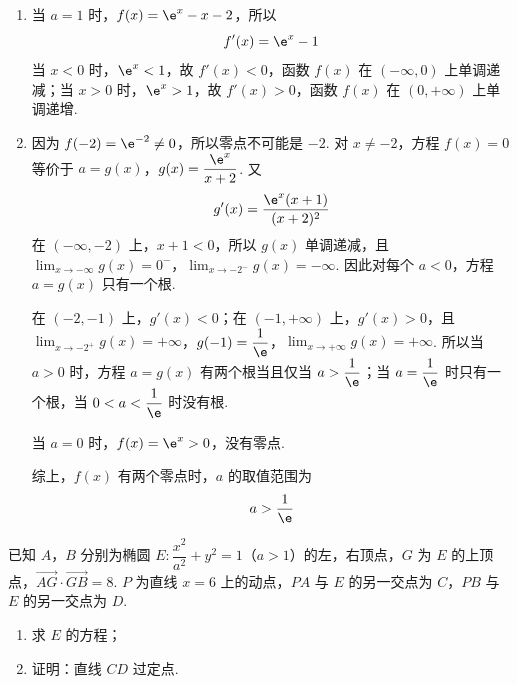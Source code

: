 \begin{solution}
\begin{enumerate}
\item 当 \(a=1\) 时，\(f(x)=\e^x-x-2\)，所以
\[
f'(x)=\e^x-1
\]
当 \(x<0\) 时，\(\e^x<1\)，故 \(f'(x)<0\)，函数 \(f(x)\) 在 \((-\infty,0)\) 上单调递减；当 \(x>0\) 时，\(\e^x>1\)，故 \(f'(x)>0\)，函数 \(f(x)\) 在 \((0,+\infty)\) 上单调递增.

\item 因为 \(f(-2)=\e^{-2}\ne0\)，所以零点不可能是 \(-2\). 对 \(x\ne-2\)，方程 \(f(x)=0\) 等价于
\(a=g(x)\)，\(g(x)=\dfrac{\e^x}{x+2}\).
又
\[
g'(x)=\dfrac{\e^x(x+1)}{(x+2)^2}
\]
在 \((-\infty,-2)\) 上，\(x+1<0\)，所以 \(g(x)\) 单调递减，且
\(\lim_{x\to-\infty}g(x)=0^{-}\)，\(\lim_{x\to-2^-}g(x)=-\infty\).
因此对每个 \(a<0\)，方程 \(a=g(x)\) 只有一个根.

在 \((-2,-1)\) 上，\(g'(x)<0\)；在 \((-1,+\infty)\) 上，\(g'(x)>0\)，且
\(\lim_{x\to-2^+}g(x)=+\infty\)，\(g(-1)=\dfrac1{\e}\)，\(\lim_{x\to+\infty}g(x)=+\infty\).
所以当 \(a>0\) 时，方程 \(a=g(x)\) 有两个根当且仅当 \(a>\dfrac1{\e}\)；当 \(a=\dfrac1{\e}\) 时只有一个根，当 \(0<a<\dfrac1{\e}\) 时没有根.

当 \(a=0\) 时，\(f(x)=\e^x>0\)，没有零点.

综上，\(f(x)\) 有两个零点时，\(a\) 的取值范围为
\[
a>\dfrac1{\e}
\]
\end{enumerate}
\end{solution}

\begin{problem}
已知 \(A\)，\(B\) 分别为椭圆 \(E:\dfrac{x^2}{a^2}+y^2=1\)（\(a>1\)）的左，右顶点，\(G\) 为 \(E\) 的上顶点，\(\overrightarrow{AG}\cdot\overrightarrow{GB}=8\). \(P\) 为直线 \(x=6\) 上的动点，\(PA\) 与 \(E\) 的另一交点为 \(C\)，\(PB\) 与 \(E\) 的另一交点为 \(D\).

\begin{enumerate}
\item 求 \(E\) 的方程；

\item 证明：直线 \(CD\) 过定点.
\end{enumerate}
\end{problem}

